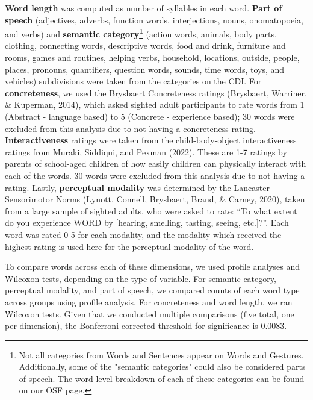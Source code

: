 \documentclass[english,man,floatsintext]{apa6}
\begin{document}
\textbf{Word length} was computed as number of syllables in each word. \textbf{Part of speech} (adjectives, adverbs, function words, interjections, nouns, onomatopoeia, and verbs) and \textbf{semantic category\footnote{Not all categories from Words and Sentences appear on Words and Gestures. Additionally, some of the "semantic categories" could also be considered parts of speech. The word-level breakdown of each of these categories can be found on our OSF page.}} (action words, animals, body parts, clothing, connecting words, descriptive words, food and drink, furniture and rooms, games and routines, helping verbs, household, locations, outside, people, places, pronouns, quantifiers, question words, sounds, time words, toys, and vehicles) subdivisions were taken from the categories on the CDI. For \textbf{concreteness}, we used the Brysbaert Concreteness ratings (Brysbaert, Warriner, \& Kuperman, 2014), which asked sighted adult participants to rate words from 1 (Abstract - language based) to 5 (Concrete - experience based); 30 words were excluded from this analysis due to not having a concreteness rating. \textbf{Interactiveness} ratings were taken from the child-body-object interactiveness ratings from Muraki, Siddiqui, and Pexman (2022). These are 1-7 ratings by parents of school-aged children of how easily children can physically interact with each of the words. 30 words were excluded from this analysis due to not having a rating. Lastly, \textbf{perceptual modality} was determined by the Lancaster Sensorimotor Norms (Lynott, Connell, Brysbaert, Brand, \& Carney, 2020), taken from a large sample of sighted adults, who were asked to rate: \enquote{To what extent do you experience WORD by {[}hearing, smelling, tasting, seeing, etc.{]}?}. Each word was rated 0-5 for each modality, and the modality which received the highest rating is used here for the perceptual modality of the word.

To compare words across each of these dimensions, we used profile analyses and Wilcoxon tests, depending on the type of variable. For semantic category, perceptual modality, and part of speech, we compared counts of each word type across groups using profile analysis. For concreteness and word length, we ran Wilcoxon tests. Given that we conducted multiple comparisons (five total, one per dimension), the Bonferroni-corrected threshold for significance is 0.0083.
\end{document}

